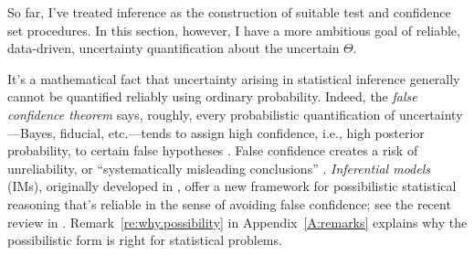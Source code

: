 \documentclass[a4paper, 12pt]{article}
\theoremstyle{plain}
\theoremstyle{definition}
\theoremstyle{remark}
\begin{document}
So far, I've treated inference as the construction of suitable test and confidence set procedures.  In this section, however, I have a more ambitious goal of reliable, data-driven, uncertainty quantification about the uncertain $\Theta$.  

It's a mathematical fact that uncertainty arising in statistical inference generally cannot be quantified reliably using ordinary probability.  Indeed, the {\em false confidence theorem} \citep{balch.martin.ferson.2017} says, roughly, every probabilistic quantification of uncertainty---Bayes, fiducial, etc.---tends to assign high confidence, i.e., high posterior probability, to certain false hypotheses \citep{martin.nonadditive, imchar, martin.belief2024}.  False confidence creates a risk of unreliability, or ``systematically misleading conclusions'' \citep{reid.cox.2014}.  
{\em Inferential models} (IMs), originally developed in \citet{imbasics, imbook}, offer a new framework for possibilistic statistical reasoning that's reliable in the sense of avoiding false confidence; see the recent review in \citet{imreview}.   Remark~\ref{re:why.possibility} in Appendix~\ref{A:remarks} explains why the possibilistic form is right for statistical problems. 


\end{document}
